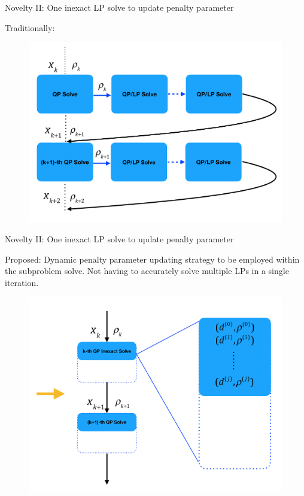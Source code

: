 \documentclass[8pt]{beamer}
\begin{document}
\begin{frame}[c]{Novelty II: One inexact LP solve to update penalty parameter}

\vfill

{\blue \leftpointright Traditionally: }

\vfill

\begin{figure}[H]
\includegraphics[scale=0.15]{pic/rhoupdate}
\end{figure}

\end{frame}




\begin{frame}[c]{Novelty II: One inexact LP solve to update penalty parameter}

\vfill

{\red  \leftpointright Proposed: } 
Dynamic penalty parameter updating strategy to be employed within the subproblem solve. Not having to accurately solve multiple LPs in a single iteration.

 
\vfill

\begin{figure}[H]
\includegraphics[scale=0.15]{pic/dynamicupdate}
\end{figure}

\end{frame}
\end{document}

